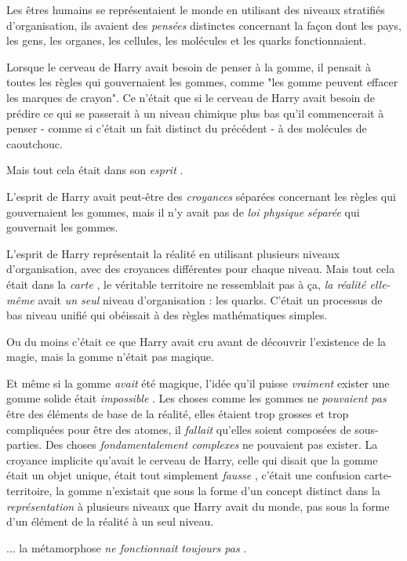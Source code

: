 Les êtres humains se représentaient le monde en utilisant des niveaux stratifiés d'organisation, ils avaient des \emph{pensées}  distinctes concernant la façon dont les pays, les gens, les organes, les cellules, les molécules et les quarks fonctionnaient.

Lorsque le cerveau de Harry avait besoin de penser à la gomme, il pensait à toutes les règles qui gouvernaient les gommes, comme "les gomme peuvent effacer les marques de crayon". Ce n'était que si le cerveau de Harry avait besoin de prédire ce qui se passerait à un niveau chimique plus bas qu'il commencerait à penser - comme si c'était un fait distinct du précédent - à des molécules de caoutchouc.

Mais tout cela était dans son \emph{esprit} .

L'esprit de Harry avait peut-être des \emph{croyances}  séparées concernant les règles qui gouvernaient les gommes, mais il n'y avait pas de \emph{loi physique}  \emph{séparée } qui gouvernait les gommes.

L'esprit de Harry représentait la réalité en utilisant plusieurs niveaux d'organisation, avec des croyances différentes pour chaque niveau. Mais tout cela était dans la \emph{carte} , le véritable territoire ne ressemblait pas à ça, \emph{la réalité elle-même}  avait \emph{un seul}  niveau d'organisation : les quarks. C'était un processus de bas niveau unifié qui obéissait à des règles mathématiques simples.

Ou du moins c'était ce que Harry avait cru avant de découvrir l'existence de la magie, mais la gomme n'était pas magique.

Et même si la gomme \emph{avait}  été magique, l'idée qu'il puisse \emph{vraiment}  exister une gomme solide était \emph{impossible} . Les choses comme les gommes ne \emph{pouvaient pas}  être des éléments de base de la réalité, elles étaient trop grosses et trop compliquées pour être des atomes, il \emph{fallait}  qu'elles soient composées de sous-parties. Des choses \emph{fondamentalement complexes}  ne pouvaient pas exister. La croyance implicite qu'avait le cerveau de Harry, celle qui disait que la gomme était un objet unique, était tout simplement \emph{fausse} , c'était une confusion carte-territoire, la gomme n'existait que sous la forme d'un concept distinct dans la \emph{représentation}  à plusieurs niveaux que Harry avait du monde, pas sous la forme d'un élément de la réalité à un seul niveau.

... la métamorphose \emph{ne fonctionnait toujours pas} .

